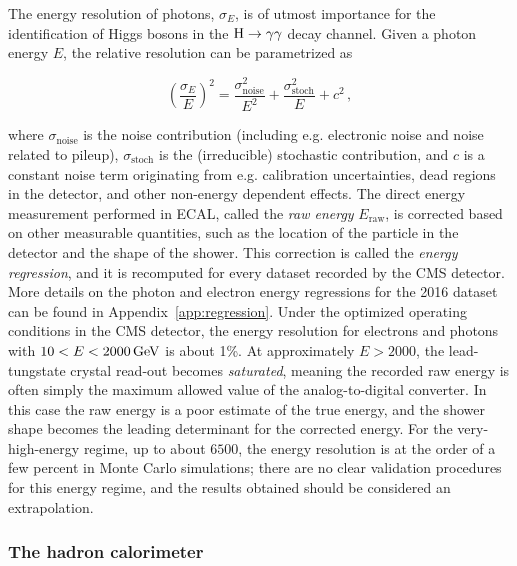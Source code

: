 The energy resolution of photons, $\sigma_E$, is of utmost importance for the identification of Higgs bosons in the $\mathrm{H}\to\mathrm{\gamma}\mathrm{\gamma}$ decay channel.
% 
Given a photon energy $E$, the relative resolution can be parametrized as~\cite{CMS:1997ysd}
% 
\begin{linenomath}
\begin{equation}
\left( \frac{\sigma_E}{E} \right)^2 =
    \frac{\sigma_\text{noise}^2}{E^2}
    + \frac{\sigma_\text{stoch}^2}{E}
    + c^2
\,,
\end{equation}
\end{linenomath}
% 
where $\sigma_\text{noise}$ is the noise contribution (including e.g. electronic noise and noise related to pileup), $\sigma_\text{stoch}$ is the (irreducible) stochastic contribution, and $c$ is a constant noise term originating from e.g. calibration uncertainties, dead regions in the detector, and other non-energy dependent effects.
% 
The direct energy measurement performed in ECAL, called the \textit{raw energy} $E_\text{raw}$, is corrected based on other measurable quantities, such as the location of the particle in the detector and the shape of the shower.
% 
This correction is called the \textit{energy regression}, and it is recomputed for every dataset recorded by the CMS detector.
% 
More details on the photon and electron energy regressions for the 2016 dataset can be found in Appendix~\ref{app:regression}.
% 
Under the optimized operating conditions in the CMS detector, the energy resolution for electrons and photons with $10 < E < 2000\,\text{GeV}$ is about 1\%.
% 
At approximately $E > 2000$\GeV, the lead-tungstate crystal read-out becomes \textit{saturated}, meaning the recorded raw energy is often simply the maximum allowed value of the analog-to-digital converter.
% 
In this case the raw energy is a poor estimate of the true energy, and the shower shape becomes the leading determinant for the corrected energy.
% 
For the very-high-energy regime, up to about $6500$\GeV, the energy resolution is at the order of a few percent in Monte Carlo simulations; there are no clear validation procedures for this energy regime, and the results obtained should be considered an extrapolation.


\subsubsection{The hadron calorimeter}

